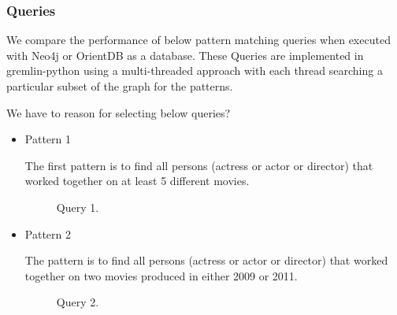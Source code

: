 \subsubsection{Queries}

We compare the performance of below pattern matching queries when executed with Neo4j or OrientDB as a database. These Queries are implemented in gremlin-python using a multi-threaded approach with each thread searching a particular subset of the graph for the patterns. 

We have to reason for selecting below queries?

\begin{itemize}

\item Pattern 1

The first pattern is to find all persons (actress or actor or director) that worked together on at least 5 different movies.

\begin{figure}[t]
\centering
{}
\caption{Query 1.}
\label{fig:query1}
\centering
\end{figure}

\item Pattern 2

The pattern is to find all persons (actress or actor or director) that worked together on two movies produced in either 2009 or 2011.

\begin{figure}[t]
\centering
{}
\caption{Query 2.}
\label{fig:query2}
\centering
\end{figure}


\end{itemize}
